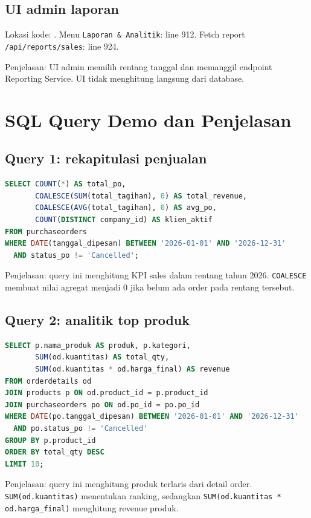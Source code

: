 \documentclass[11pt,a4paper]{article}
\begin{document}
\subsection*{UI admin laporan}
Lokasi kode: . Menu \texttt{Laporan \& Analitik}: line 912. Fetch report \texttt{/api/reports/sales}: line 924.

Penjelasan: UI admin memilih rentang tanggal dan memanggil endpoint Reporting Service. UI tidak menghitung langsung dari database.

\section*{SQL Query Demo dan Penjelasan}
\subsection*{Query 1: rekapitulasi penjualan}
\begin{lstlisting}[language=SQL]
SELECT COUNT(*) AS total_po,
       COALESCE(SUM(total_tagihan), 0) AS total_revenue,
       COALESCE(AVG(total_tagihan), 0) AS avg_po,
       COUNT(DISTINCT company_id) AS klien_aktif
FROM purchaseorders
WHERE DATE(tanggal_dipesan) BETWEEN '2026-01-01' AND '2026-12-31'
  AND status_po != 'Cancelled';
\end{lstlisting}
Penjelasan: query ini menghitung KPI sales dalam rentang tahun 2026. \texttt{COALESCE} membuat nilai agregat menjadi 0 jika belum ada order pada rentang tersebut.

\subsection*{Query 2: analitik top produk}
\begin{lstlisting}[language=SQL]
SELECT p.nama_produk AS produk, p.kategori,
       SUM(od.kuantitas) AS total_qty,
       SUM(od.kuantitas * od.harga_final) AS revenue
FROM orderdetails od
JOIN products p ON od.product_id = p.product_id
JOIN purchaseorders po ON od.po_id = po.po_id
WHERE DATE(po.tanggal_dipesan) BETWEEN '2026-01-01' AND '2026-12-31'
  AND po.status_po != 'Cancelled'
GROUP BY p.product_id
ORDER BY total_qty DESC
LIMIT 10;
\end{lstlisting}
Penjelasan: query ini menghitung produk terlaris dari detail order. \texttt{SUM(od.kuantitas)} menentukan ranking, sedangkan \texttt{SUM(od.kuantitas * od.harga\_final)} menghitung revenue produk.
\end{document}
